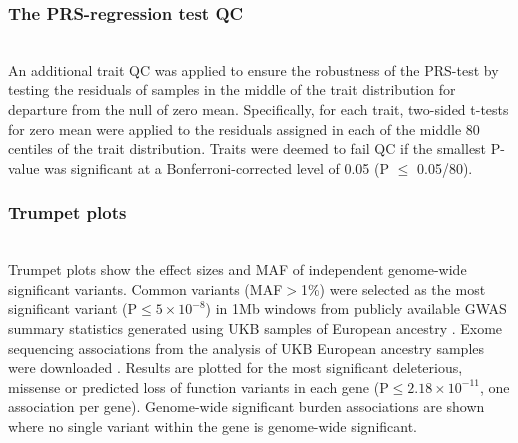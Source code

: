 \documentclass[times]{zHenriquesLab-StyleBioRxiv}
\begin{document}
\subsubsection*{The PRS-regression test QC}~\\
An additional trait QC was applied to ensure the robustness of the
PRS-test by testing the residuals of samples in the middle of the
trait distribution for departure from the null of zero mean.
Specifically, for each trait, two-sided t-tests for zero mean were
applied to the residuals assigned in each of the middle 80 centiles of
the trait distribution. Traits were deemed to fail QC if the smallest
P-value was significant at a Bonferroni-corrected level of 0.05 (P
$\le$ 0.05/80).


\subsubsection*{Trumpet plots} ~\\
Trumpet plots show the effect sizes and MAF of independent genome-wide
significant variants. Common variants (MAF$>$1\%) were selected as the
most significant variant (P$\le 5\times 10^{-8}$) in 1Mb windows from
publicly available GWAS summary statistics generated using UKB samples
of European ancestry \cite{neale}. Exome sequencing associations from
the analysis of UKB European ancestry samples were downloaded
\cite{backman}. Results are plotted for the most significant
deleterious, missense or predicted loss of function variants in each gene
(P$\le 2.18\times 10^{-11}$, one association per gene). Genome-wide
significant burden associations are shown where no single variant
within the gene is genome-wide significant.
\end{document}
